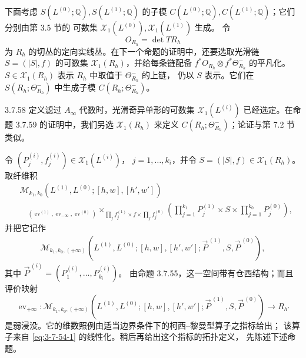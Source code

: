 下面考虑 $S(L^{(0)};\mathbb Q),S(L^{(1)};\mathbb Q)$ 的子模
$C(L^{(0)};\mathbb Q),C(L^{(1)};\mathbb Q)$；它们分别由第 3.5 节的
可数集 $\mathcal X_1(L^{(0)}),\mathcal X_1(L^{(1)})$ 生成。
令
\[
 O_{R_h}=\det TR_h
\]
为 $R_h$ 的切丛的定向实线丛。在下一个命题的证明中，还要选取光滑链
$S=(|S|,f)$ 的可数集 $\mathcal X_1(R_h)$，并给每条链配备
$f^*O_{R_h}\otimes f^*\Theta^-_{R_h}$ 的平凡化。
$S\in\mathcal X_1(R_h)$ 表示 $R_h$ 中取值于 $\Theta^-_{R_h}$ 的上链，
仍以 $S$ 表示。它们在 $S(R_h;\Theta^-_{R_h})$ 中生成子模
$C(R_h;\Theta^-_{R_h})$。

\begin{remark}{3.7.58}\label{rem:3-7-58}
定义滤过 $A_\infty$ 代数时，光滑奇异单形的可数集
$\mathcal X_1(L^{(i)})$ 已经选定。在命题 3.7.59 的证明中，我们另选
$\mathcal X_1(R_h)$ 来定义 $C(R_h;\Theta^-_{R_h})$；论证与第 7.2 节类似。
\end{remark}

令 $(P_j^{(i)},f_j^{(i)})\in\mathcal X_1(L^{(i)})$，
$j=1,\ldots,k_i$，并令
$S=(|S|,f)\in\mathcal X_1(R_h)$。取纤维积
\[
\begin{aligned}
 &\mathcal M_{k_1,k_0}
 (L^{(1)},L^{(0)};[h,w],[h',w'])\\
 &\quad{}_{(\operatorname{ev}^{(1)},\operatorname{ev}_{-\infty},
 \operatorname{ev}^{(0)})}
 \mathop{\times}_{\prod_j f_j^{(1)}\times f\times\prod_j f_j^{(0)}}
 \left(
 \prod_{j=1}^{k_1}P_j^{(1)}
 \times S\times
 \prod_{j=1}^{k_0}P_j^{(0)}
 \right),
\end{aligned}
\]
并把它记作
\[
\begin{aligned}
 \mathcal M_{k_1,k_0,(+\infty)}
 (L^{(1)},L^{(0)};[h,w],[h',w'];
 \vec P^{\,(1)},S,\vec P^{\,(0)}),
\end{aligned}
\]
其中
$\vec P^{\,(i)}=(P_1^{(i)},\ldots,P_{k_i}^{(i)})$。
由命题 3.7.55，这一空间带有仓西结构；而且评价映射
\[
 \operatorname{ev}_{+\infty}\colon
 \mathcal M_{k_1,k_0,(+\infty)}
 (L^{(1)},L^{(0)};[h,w],[h',w'];
 \vec P^{\,(1)},S,\vec P^{\,(0)})
 \longrightarrow R_{h'}
\]
是弱浸没。它的维数照例由适当边界条件下的柯西--黎曼型算子之指标给出；
该算子来自 \eqref{eq:3-7-54-1} 的线性化。稍后再给出这个指标的拓扑定义，
先陈述下述命题。

